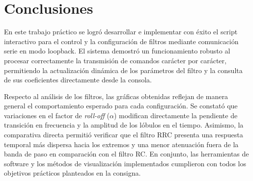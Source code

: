 \documentclass[11pt,a4paper]{article}
\begin{document}
\section{Conclusiones}

En este trabajo práctico se logró desarrollar e implementar con éxito el script
interactivo para el control y la configuración de filtros mediante comunicación
serie en modo loopback. El sistema demostró un funcionamiento robusto al
procesar correctamente la transmisión de comandos carácter por carácter,
permitiendo la actualización dinámica de los parámetros del filtro y la
consulta de sus coeficientes directamente desde la consola.

Respecto al análisis de los filtros, las gráficas obtenidas reflejan de manera
general el comportamiento esperado para cada configuración. Se constató que
variaciones en el factor de \textit{roll-off} ($\alpha$) modifican directamente
la pendiente de transición en frecuencia y la amplitud de los lóbulos en el
tiempo. Asimismo, la comparativa directa permitió verificar que el filtro RRC
presenta una respuesta temporal más dispersa hacia los extremos y una menor
atenuación fuera de la banda de paso en comparación con el filtro RC. En
conjunto, las herramientas de software y los métodos de visualización
implementados cumplieron con todos los objetivos prácticos planteados en la
consigna.
\end{document}
